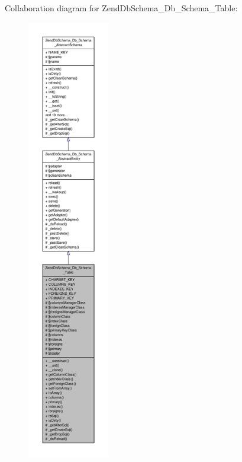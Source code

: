Collaboration diagram for Zend\-Db\-Schema\-\_\-\-Db\-\_\-\-Schema\-\_\-\-Table\-:\nopagebreak
\begin{figure}[H]
\begin{center}
\leavevmode
\includegraphics[height=550pt]{classZendDbSchema__Db__Schema__Table__coll__graph}
\end{center}
\end{figure}
